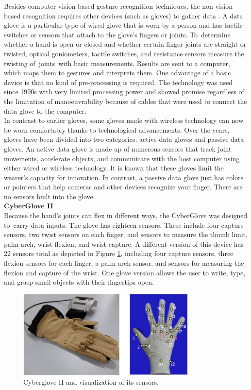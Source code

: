  Besides computer vision-based gesture recognition techniques, the non-vision-based recognition requires other devices (such as gloves) to gather data  \cite{bhuyan2017review}.
A data glove is a particular type of wired glove that is worn by a person and has tactile switches or sensors that attach to the glove's fingers or joints. To determine whether a hand is open or closed and whether certain finger joints are straight or twisted, optical goniometers, tactile switches, and resistance sensors measure the twisting of joints with basic measurements. Results are sent to a computer, which maps them to gestures and interprets them. One advantage of a basic device is that no kind of pre-processing is required. The technology was used since 1990s with very limited processing power and showed promise  regardless of the limitation of manoeuvrability because of cables that were used to connect the data glove to the computer. \cite{premaratne2014human}
\\
In contrast to earlier gloves, some gloves made with wireless technology can now be worn comfortably thanks to technological advancements. Over the years, gloves have been divided into two categories: active data gloves and passive data gloves. An active data glove is made up of numerous sensors that track joint movements, accelerate objects, and communicate with the host computer using either wired or wireless technology. It is known that these gloves limit the wearer's capacity for innovation. In contrast, a passive data glove just has colors or pointers that help cameras and other devices recognize your finger. There are no sensors built into the glove.\\

\textbf{CyberGlove II}\label{txt:glove}\\
Because the hand's joints can flex in different ways, the CyberGlove was designed to~carry data inputs. The glove has eighteen sensors. These include four capture sensors, two twist sensors on each finger, and sensors to measure the thumb limit, palm arch, wrist flexion, and wrist capture. A different version of this device has 22 sensors total  as depicted in Figure \ref{fig:glove}, including four capture sensors, three flexion sensors for each finger, a palm arch sensor, and sensors for measuring the flexion and capture of the wrist. One glove version allows the user to write, type, and grasp small objects with their fingertips open.

\begin{figure}[ht!]
	\centering
		\includegraphics[width=0.80\textwidth]{images/cyberglove.png}
		\caption{Cyberglove II and visualization of its sensors. }
		\label{fig:glove}
\end{figure}

